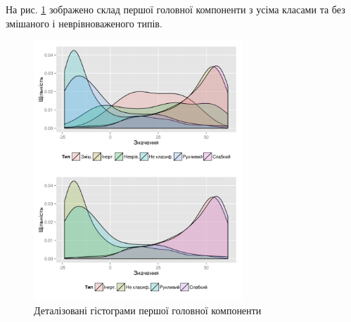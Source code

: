 На рис. \ref{fig:pca1} зображено склад першої головної компоненти
з усіма класами та без змішаного і неврівноваженого типів.
\begin{figure}[h]
  \centering
    \includegraphics[width=0.7\textwidth]{images/pca1_hist}
  \caption{Деталізовані гістограми першої головної компоненти}
  \label{fig:pca1}
\end{figure}


